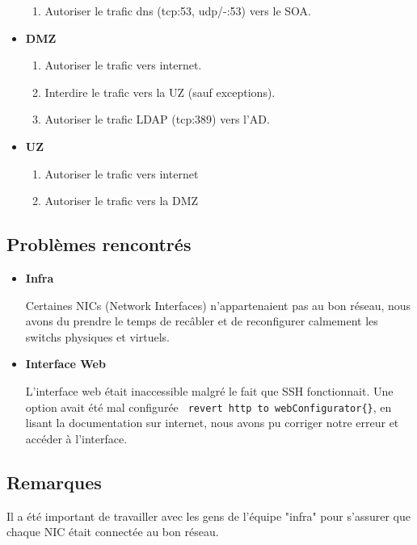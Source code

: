 \documentclass{article}
\begin{document}
\begin{itemize}
\begin{enumerate}
                \item Autoriser le trafic dns (tcp:53, udp/-:53) vers     le SOA.
                \end{enumerate}
            \item \textbf{DMZ} \begin{enumerate}
                \item Autoriser le trafic vers internet.
                \item Interdire le trafic vers la UZ (sauf exceptions).
                \item Autoriser le trafic LDAP (tcp:389) vers l'AD.
            \end{enumerate}
            \item \textbf{UZ} \begin{enumerate}
                \item Autoriser le trafic vers internet
                \item Autoriser le trafic vers la DMZ
            \end{enumerate}
        \end{itemize}
   
    \subsection{Problèmes rencontrés} 
        \begin{itemize}
            \item \textbf{Infra}
            
            Certaines NICs (Network Interfaces) n'appartenaient pas au bon réseau, nous avons du prendre le temps de recâbler et de reconfigurer calmement les switchs physiques et virtuels.
            \item \textbf{Interface Web}
            
            L'interface web était inaccessible malgré le fait que SSH fonctionnait. Une option avait été mal configurée \verb| revert http to webConfigurator{}|, en lisant la documentation sur internet, nous avons pu corriger notre erreur et accéder à l'interface.
        \end{itemize}
        
    \subsection{Remarques}
    Il a été important de travailler avec les gens de l'équipe "infra" pour s'assurer que chaque NIC était connectée au bon réseau.
    
\end{document}
